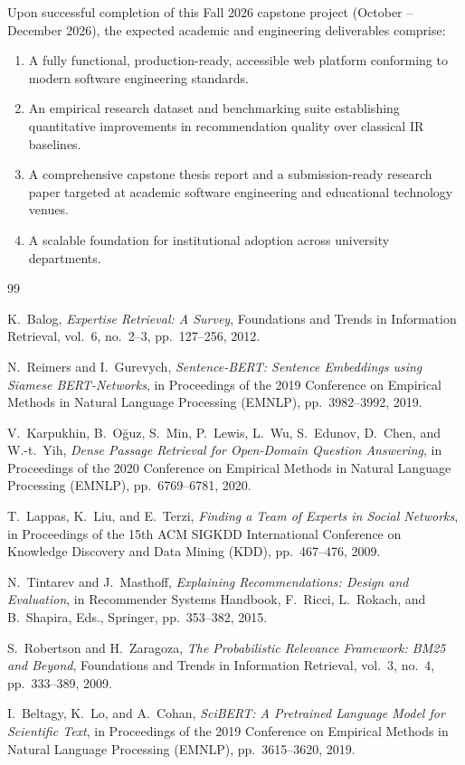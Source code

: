 \documentclass[11pt,a4paper]{article}
\begin{document}
Upon successful completion of this Fall 2026 capstone project (October -- December 2026), the expected academic and engineering deliverables comprise:
\begin{enumerate}
    \item A fully functional, production-ready, accessible web platform conforming to modern software engineering standards.
    \item An empirical research dataset and benchmarking suite establishing quantitative improvements in recommendation quality over classical IR baselines.
    \item A comprehensive capstone thesis report and a submission-ready research paper targeted at academic software engineering and educational technology venues.
    \item A scalable foundation for institutional adoption across university departments.
\end{enumerate}

\begin{thebibliography}{99}

K.~Balog,
\emph{Expertise Retrieval: A Survey},
Foundations and Trends in Information Retrieval, vol.~6, no.~2--3, pp.~127--256, 2012.

N.~Reimers and I.~Gurevych,
\emph{Sentence-BERT: Sentence Embeddings using Siamese BERT-Networks},
in Proceedings of the 2019 Conference on Empirical Methods in Natural Language Processing (EMNLP), pp.~3982--3992, 2019.

V.~Karpukhin, B.~O{\u{g}}uz, S.~Min, P.~Lewis, L.~Wu, S.~Edunov, D.~Chen, and W.-t.~Yih,
\emph{Dense Passage Retrieval for Open-Domain Question Answering},
in Proceedings of the 2020 Conference on Empirical Methods in Natural Language Processing (EMNLP), pp.~6769--6781, 2020.

T.~Lappas, K.~Liu, and E.~Terzi,
\emph{Finding a Team of Experts in Social Networks},
in Proceedings of the 15th ACM SIGKDD International Conference on Knowledge Discovery and Data Mining (KDD), pp.~467--476, 2009.

N.~Tintarev and J.~Masthoff,
\emph{Explaining Recommendations: Design and Evaluation},
in Recommender Systems Handbook, F.~Ricci, L.~Rokach, and B.~Shapira, Eds., Springer, pp.~353--382, 2015.

S.~Robertson and H.~Zaragoza,
\emph{The Probabilistic Relevance Framework: BM25 and Beyond},
Foundations and Trends in Information Retrieval, vol.~3, no.~4, pp.~333--389, 2009.

I.~Beltagy, K.~Lo, and A.~Cohan,
\emph{SciBERT: A Pretrained Language Model for Scientific Text},
in Proceedings of the 2019 Conference on Empirical Methods in Natural Language Processing (EMNLP), pp.~3615--3620, 2019.

\end{thebibliography}
\end{document}
